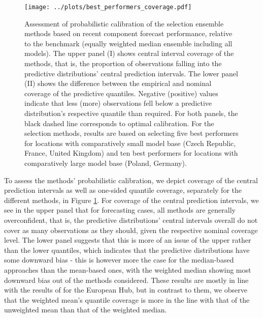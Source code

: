 \begin{figure}
\centering
\texttt{[image: ../plots/best\_performers\_coverage.pdf]}
\caption{Assessment of probabilistic calibration of the selection ensemble methods based on recent component forecast performance, relative to the benchmark (equally weighted median ensemble including all models). The upper panel (I) shows central interval coverage of the methods, that is, the proportion of observations falling into the predictive distributions' central prediction intervals. The lower panel (II) shows the difference between the empirical and nominal coverage of the predictive quantiles. Negative (positive) values indicate that less (more) observations fell below a predictive distribution's respective quantile than required. For both panels, the black dashed line corresponds to optimal calibration. For the selection methods, results are based on selecting five best performers for locations with comparatively small model base (Czech Republic, France, United Kingdom) and ten best performers for locations with comparatively large model base (Poland, Germany).}
\label{fig:bpcoverage}
\end{figure}
To assess the methods' probabilistic calibration, we depict coverage of the central prediction intervals as well as one-sided quantile coverage, separately for the different methods, in Figure \ref{fig:bpcoverage}. For coverage of the central prediction intervals, we see in the upper panel that for forecasting cases, all methods are generally overconfident, that is, the predictive distributions' central intervals overall do not cover as many observations as they should, given the respective nominal coverage level. %
The lower panel suggests that this is more of an issue of the upper rather than the lower quantiles, which indicates that the predictive distributions have some downward bias - this is however more the case for the median-based approaches than the mean-based ones, with the weighted median showing most downward bias out of the methods considered. These results are mostly in line with the results of \cite{ray_comparing_2022} for the European Hub, but in contrast to them, we observe that the weighted mean's quantile coverage is more in the line with that of the unweighted mean than that of the weighted median.\\ 
